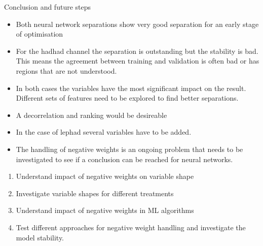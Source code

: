 \begin{frame}{Conclusion and future steps}
    \begin{itemize}
        \item Both neural network separations show very good separation for an early stage of optimisation
        \vspace{0.2cm}
        \item For the hadhad channel the separation is outstanding but the stability is bad. This means the agreement between training and validation is often bad
        or has regions that are not understood.
        \vspace{0.2cm}
        \item In both cases the variables have the most significant impact on the result. Different sets of features need to be explored to find better separations.
        \vspace{0.2cm}
        \item A decorrelation and ranking would be desireable
        \vspace{0.2cm}
        \item In the case of lephad several variables have to be added.
        \vspace{0.2cm}
        \item The handling of negative weights is an ongoing problem that needs to be investigated to see if a conclusion can be reached for neural networks.
    \end{itemize}
\end{frame}

\begin{frame}
    \begin{enumerate}
        \item Understand impact of negative weights on variable shape
        \item Investigate variable shapes for different treatments
        \item Understand impact of negative weights in ML algorithms
        \item Test different approaches for negative weight handling and investigate the model stability.
    \end{enumerate}
\end{frame}
